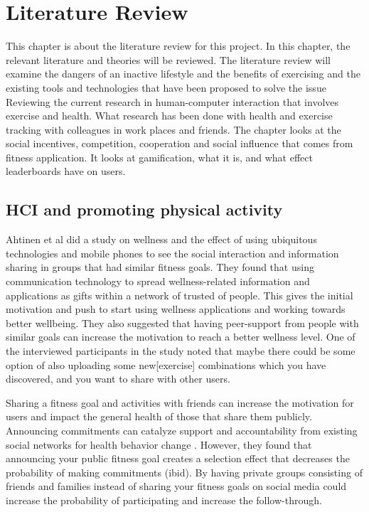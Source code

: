 \chapter{Literature Review} \label{litrev}
This chapter is about the literature review for this project. In this chapter, the relevant literature and theories will be reviewed. The literature review will examine the dangers of an inactive lifestyle and the benefits of exercising and the existing tools and technologies that have been proposed to solve the issue Reviewing the current research in human-computer interaction that involves exercise and health. What research has been done with health and exercise tracking with colleagues in work places and friends. The chapter looks at the social incentives, competition, cooperation and social influence that comes from fitness application. It looks at gamification, what it is, and what effect leaderboards have on users.

\section{HCI and promoting physical activity}
Ahtinen et al\cite{Ahtinen2009} did a study on wellness and the effect of using ubiquitous technologies and mobile phones to see the social interaction and information sharing in groups that had similar fitness goals. They found that using communication technology to spread wellness-related information and applications as gifts within a network of trusted of people. This gives the initial motivation and push to start using wellness applications and working towards better wellbeing. They also suggested that having peer-support from people with similar goals can increase the motivation to reach a better wellness level. One of the interviewed participants in the study noted that maybe there could be some option of also uploading some new[exercise] combinations which you have discovered, and you want to share with other users.

Sharing a fitness goal and activities with friends can increase the motivation for users and impact the general health of those that share them publicly. Announcing  commitments can catalyze support and accountability from existing social networks for health behavior change \cite{Munson2015}. However, they found that announcing your public fitness goal creates a selection effect that decreases the probability of making commitments (ibid).  By having private groups consisting of friends and families instead of sharing your fitness goals on social media could increase the probability of participating and increase the follow-through.

